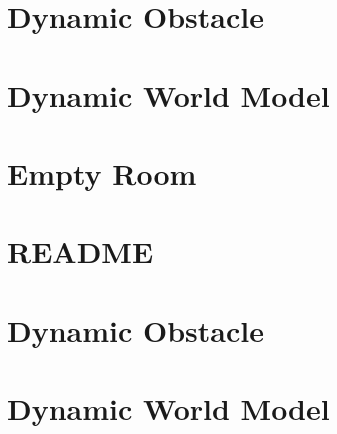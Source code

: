 \documentclass[twoside]{book}
\newcommand{\+}{\discretionary{\mbox{\scriptsize$\hookleftarrow$}}{}{}}
\begin{document}
\chapter{Dynamic Obstacle}
\label{md_smacc2_sm_reference_library_sm_aws_warehouse_navigation_models_dynamic_obstacle_README}

\chapter{Dynamic World Model}
\label{md_smacc2_sm_reference_library_sm_aws_warehouse_navigation_models_dynamic_world_README}

\chapter{Empty Room}
\label{md_smacc2_sm_reference_library_sm_aws_warehouse_navigation_models_empty_room_README}

\chapter{README}
\label{md_smacc2_sm_reference_library_sm_branching_README}

\chapter{Dynamic Obstacle}
\label{md_smacc2_sm_reference_library_sm_dance_bot_models_dynamic_obstacle_README}

\chapter{Dynamic World Model}
\label{md_smacc2_sm_reference_library_sm_dance_bot_models_dynamic_world_README}

\end{document}
